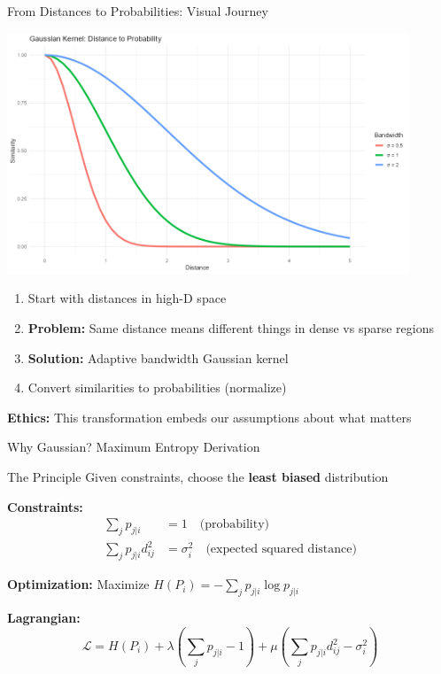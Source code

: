 \documentclass[aspectratio=169]{beamer}
\newcommand{\ethics}[1]{\colorbox{purple!10}{\textcolor{ethicscolor}{\textbf{Ethics:} #1}}}
\begin{document}
\begin{frame}{From Distances to Probabilities: Visual Journey}
\begin{center}
\includegraphics[width=0.9\textwidth]{./Figures/distance_to_probability_animation.png}
\end{center}

\begin{enumerate}
\item Start with distances in high-D space
\item \textbf{Problem:} Same distance means different things in dense vs sparse regions
\item \textbf{Solution:} Adaptive bandwidth Gaussian kernel
\item Convert similarities to probabilities (normalize)
\end{enumerate}

\ethics{This transformation embeds our assumptions about what matters}
\end{frame}

\begin{frame}{Why Gaussian? Maximum Entropy Derivation}
\begin{block}{The Principle}
Given constraints, choose the \textbf{least biased} distribution
\end{block}

\textbf{Constraints:}
\begin{align}
\sum_j p_{j|i} &= 1 \quad \text{(probability)}\\
\sum_j p_{j|i} d_{ij}^2 &= \sigma_i^2 \quad \text{(expected squared distance)}
\end{align}

\textbf{Optimization:} Maximize $H(P_i) = -\sum_j p_{j|i}\log p_{j|i}$

\textbf{Lagrangian:}
$$\mathcal{L} = H(P_i) + \lambda\left(\sum_j p_{j|i} - 1\right) + \mu\left(\sum_j p_{j|i}d_{ij}^2 - \sigma_i^2\right)$$
\end{frame}
\end{document}
